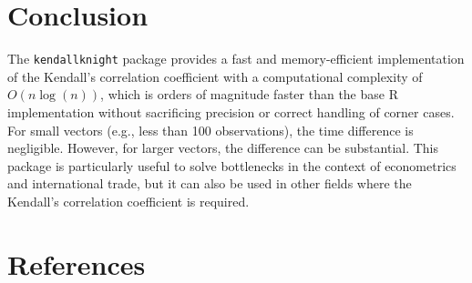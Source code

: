 \documentclass[12pt]{article}
\begin{document}
\section{Conclusion}\label{conclusion}

The \texttt{kendallknight} package provides a fast and memory-efficient
implementation of the Kendall's correlation coefficient with a
computational complexity of \(O(n \log(n))\), which is orders of
magnitude faster than the base R implementation without sacrificing
precision or correct handling of corner cases. For small vectors (e.g.,
less than 100 observations), the time difference is negligible. However,
for larger vectors, the difference can be substantial. This package is
particularly useful to solve bottlenecks in the context of econometrics
and international trade, but it can also be used in other fields where
the Kendall's correlation coefficient is required.

\section*{References}\label{references}
\end{document}
